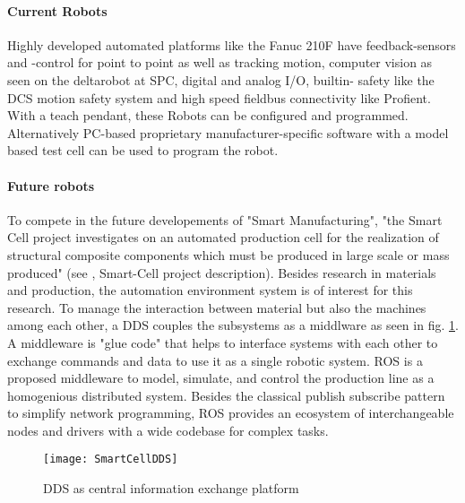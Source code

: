\paragraph{Current Robots}
Highly developed automated platforms like the Fanuc 210F have feedback-sensors and -control for point to point as well as tracking motion, computer vision as seen on the deltarobot at \ac{SPC}, digital and analog I/O,  builtin- safety like the \ac{DCS} motion safety system and high speed fieldbus connectivity like Profient.
With a teach pendant, these Robots can be configured and programmed. Alternatively \ac{PC}-based proprietary manufacturer-specific software with a model based test cell can be used to program the robot. 
\medskip

\paragraph{Future robots}
To compete in the future developements of "Smart Manufacturing", "the Smart Cell  project investigates on an automated production cell for the realization of structural composite components which must be produced in large scale or mass produced" (see \cite{SPCWebsite}, Smart-Cell project description). 
Besides research in materials and production, the automation environment system is of interest for this research.
To manage the interaction between material but also the machines among each other, a \ac{DDS} couples the subsystems as a middlware as seen in \ac{fig}. \ref{fig:SmartCellDDS}. A middleware is "glue code" that helps to interface systems with each other to exchange commands and data to use it as a single robotic system. 
\ac{ROS} is a proposed middleware to model, simulate, and control the production line as a homogenious distributed system. 
Besides the classical publish subscribe  pattern to simplify network programming, \ac{ROS} provides an ecosystem of interchangeable nodes and drivers with a wide codebase for complex tasks.
\medskip
\begin{figure}[H]
	\texttt{[image: SmartCellDDS]}
	\caption{\ac{DDS} as central information exchange platform}
	\label{fig:SmartCellDDS}
\end{figure}

%
